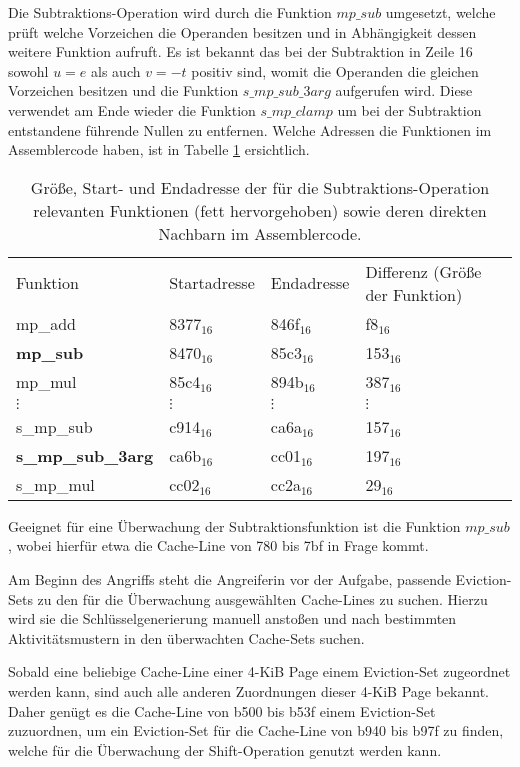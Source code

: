 Die Subtraktions-Operation wird durch die Funktion $mp\_sub$ umgesetzt, welche prüft welche Vorzeichen die Operanden besitzen und in Abhängigkeit dessen weitere Funktion aufruft.
Es ist bekannt das bei der Subtraktion in Zeile 16 sowohl $u=e$ als auch $v=-t$ positiv sind, womit die Operanden die gleichen Vorzeichen besitzen und die Funktion $s\_mp\_sub\_3arg$ aufgerufen wird.
Diese verwendet am Ende wieder die Funktion $s\_mp\_clamp$ um bei der Subtraktion entstandene führende Nullen zu entfernen.
Welche Adressen die Funktionen im Assemblercode haben, ist in Tabelle \ref{tbl:assOffsetSub} ersichtlich. 


\begin{table}[h]
\caption{Größe, Start- und Endadresse der für die Subtraktions-Operation relevanten Funktionen (fett hervorgehoben) sowie deren direkten Nachbarn im Assemblercode.}
\label{tbl:assOffsetSub}
\begin{tabular}{llll}
Funktion         & Startadresse & Endadresse & Differenz (Größe der Funktion) \\[10pt]
mp\_add & 8377$_{16}$ & 846f$_{16}$ & f8$_{16}$\\
\textbf{mp\_sub} & 8470$_{16}$ & 85c3$_{16}$ & 153$_{16}$ \\
mp\_mul & 85c4$_{16}$ & 894b$_{16}$ & 387$_{16}$ \\
$\vdots$               &  $\vdots$             &    $\vdots$         &     $\vdots$   \\
s\_mp\_sub       & c914$_{16}$         & ca6a$_{16}$       & 157$_{16}$   \\
\textbf{s\_mp\_sub\_3arg} & ca6b$_{16}$         & cc01$_{16}$       & 197$_{16}$   \\
s\_mp\_mul       & cc02$_{16}$         & cc2a$_{16}$       & 29$_{16}$   
\end{tabular}
\end{table}

Geeignet für eine Überwachung der Subtraktionsfunktion ist die Funktion $mp\_sub$, wobei hierfür etwa die Cache-Line von 780 bis 7bf in Frage kommt.

Am Beginn des Angriffs steht die Angreiferin vor der Aufgabe, passende Eviction-Sets zu den für die Überwachung ausgewählten Cache-Lines zu suchen.
Hierzu wird sie die Schlüsselgenerierung manuell anstoßen und nach bestimmten Aktivitätsmustern in den überwachten Cache-Sets suchen.

Sobald eine beliebige Cache-Line einer 4-KiB Page einem Eviction-Set zugeordnet werden kann, sind auch alle anderen Zuordnungen dieser 4-KiB Page bekannt.
Daher genügt es die Cache-Line von b500 bis b53f einem Eviction-Set zuzuordnen, um ein Eviction-Set für die Cache-Line von b940 bis b97f zu finden, welche für die Überwachung der Shift-Operation genutzt werden kann.

